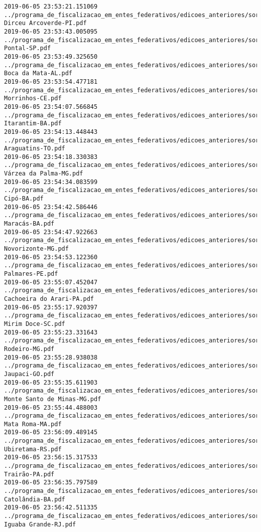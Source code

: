 \begin{lstlisting}
2019-06-05 23:53:21.151069 ../programa_de_fiscalizacao_em_entes_federativos/edicoes_anteriores/sorteio_38/3024-Dirceu Arcoverde-PI.pdf
2019-06-05 23:53:43.005095 ../programa_de_fiscalizacao_em_entes_federativos/edicoes_anteriores/sorteio_38/3068-Pontal-SP.pdf
2019-06-05 23:53:49.325650 ../programa_de_fiscalizacao_em_entes_federativos/edicoes_anteriores/sorteio_38/2951-Boca da Mata-AL.pdf
2019-06-05 23:53:54.477181 ../programa_de_fiscalizacao_em_entes_federativos/edicoes_anteriores/sorteio_38/2973-Morrinhos-CE.pdf
2019-06-05 23:54:07.566845 ../programa_de_fiscalizacao_em_entes_federativos/edicoes_anteriores/sorteio_38/2963-Itarantim-BA.pdf
2019-06-05 23:54:13.448443 ../programa_de_fiscalizacao_em_entes_federativos/edicoes_anteriores/sorteio_38/3070-Araguatins-TO.pdf
2019-06-05 23:54:18.330383 ../programa_de_fiscalizacao_em_entes_federativos/edicoes_anteriores/sorteio_38/2999-Várzea da Palma-MG.pdf
2019-06-05 23:54:34.083599 ../programa_de_fiscalizacao_em_entes_federativos/edicoes_anteriores/sorteio_38/2961-Cipó-BA.pdf
2019-06-05 23:54:42.586446 ../programa_de_fiscalizacao_em_entes_federativos/edicoes_anteriores/sorteio_38/2965-Maracás-BA.pdf
2019-06-05 23:54:47.922663 ../programa_de_fiscalizacao_em_entes_federativos/edicoes_anteriores/sorteio_38/2991-Novorizonte-MG.pdf
2019-06-05 23:54:53.122360 ../programa_de_fiscalizacao_em_entes_federativos/edicoes_anteriores/sorteio_38/3020-Palmares-PE.pdf
2019-06-05 23:55:07.452047 ../programa_de_fiscalizacao_em_entes_federativos/edicoes_anteriores/sorteio_38/3008-Cachoeira do Arari-PA.pdf
2019-06-05 23:55:17.920397 ../programa_de_fiscalizacao_em_entes_federativos/edicoes_anteriores/sorteio_38/3052-Mirim Doce-SC.pdf
2019-06-05 23:55:23.331643 ../programa_de_fiscalizacao_em_entes_federativos/edicoes_anteriores/sorteio_38/2995-Rodeiro-MG.pdf
2019-06-05 23:55:28.938038 ../programa_de_fiscalizacao_em_entes_federativos/edicoes_anteriores/sorteio_38/2979-Jaupaci-GO.pdf
2019-06-05 23:55:35.611903 ../programa_de_fiscalizacao_em_entes_federativos/edicoes_anteriores/sorteio_38/2989-Monte Santo de Minas-MG.pdf
2019-06-05 23:55:44.488003 ../programa_de_fiscalizacao_em_entes_federativos/edicoes_anteriores/sorteio_38/2985-Mata Roma-MA.pdf
2019-06-05 23:56:09.489145 ../programa_de_fiscalizacao_em_entes_federativos/edicoes_anteriores/sorteio_38/3048-Ubiretama-RS.pdf
2019-06-05 23:56:15.317533 ../programa_de_fiscalizacao_em_entes_federativos/edicoes_anteriores/sorteio_38/3010-Trairão-PA.pdf
2019-06-05 23:56:35.797589 ../programa_de_fiscalizacao_em_entes_federativos/edicoes_anteriores/sorteio_38/2959-Catolândia-BA.pdf
2019-06-05 23:56:42.511335 ../programa_de_fiscalizacao_em_entes_federativos/edicoes_anteriores/sorteio_38/3034-Iguaba Grande-RJ.pdf

\end{lstlisting}
